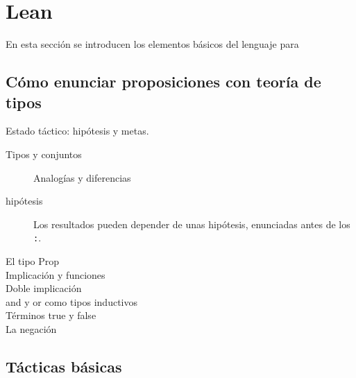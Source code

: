 \newpage
\section{Lean}

En esta sección se introducen los elementos básicos del lenguaje para

\subsection{Cómo enunciar proposiciones con teoría de tipos}

Estado táctico: hipótesis y metas.

\begin{description}
    \item[Tipos y conjuntos] Analogías y diferencias
    \item[hipótesis] Los resultados pueden depender de unas hipótesis,
        enunciadas antes de los \lstinline{:}.
    \item[El tipo Prop] 
    \item[Implicación y funciones] 
    \item[Doble implicación] 
    \item[and y or como tipos inductivos] 
    \item[Términos true y false] 
    \item[La negación] 
\end{description}

\subsection{Tácticas básicas}

